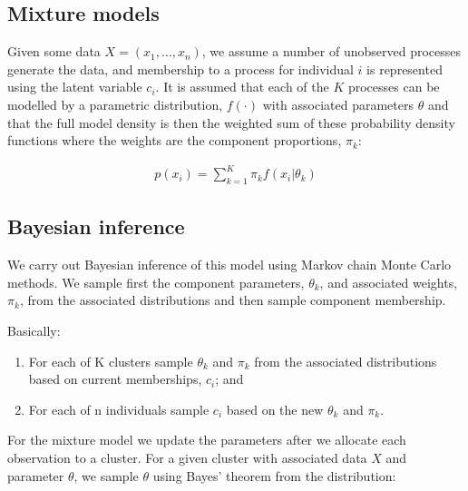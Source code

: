 \documentclass[12pt]{article} %
\begin{document}
	\subsection{Mixture models} \label{mixture_models}
	Given some data $X = (x_1, \ldots, x_n)$, we assume a number of unobserved processes generate the data, and membership to a process for individual $i$ is represented using the latent variable $c_i$. It is assumed that each of the $K$ processes can be modelled by a parametric distribution, $f(\cdot)$ with associated parameters $\theta$ and that the full model density is then the weighted sum of these probability density functions where the weights are the component proportions, $\pi_k$:
	
	\begin{align}
	p(x_i) = \sum_{k=1}^K \pi_k f(x_i | \theta_k)
	\end{align}
	
	\subsection{Bayesian inference}	
	We carry out Bayesian inference of this model using Markov chain Monte Carlo methods. We sample first the component parameters, $\theta_k$, and associated weights, $\pi_k$, from the associated distributions and then sample component membership.
	
	Basically:
	\begin{enumerate}
		\item For each of K clusters sample $\theta_k$ and $\pi_k$ from the associated distributions based on current memberships, $c_i$; and
		\item For each of n individuals sample $c_i$ based on the new $\theta_k$ and $\pi_k$.
	\end{enumerate}
	
	For the mixture model we update the parameters after we allocate each observation to a cluster. For a given cluster with associated data $X$ and parameter $\theta$, we sample $\theta$ using Bayes' theorem from the distribution:
	
\end{document}
